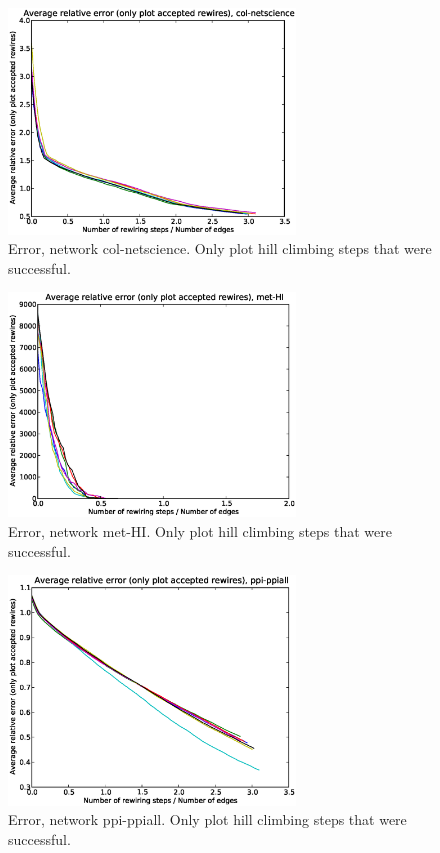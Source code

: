 \begin{figure}[p]
\centering
\includegraphics[width=3in]{Figures/acceptedOnly-col-netscience.eps}
\caption{Error, network col-netscience.  Only plot hill climbing steps that were successful.}
\label{fig:errors-col-netscience}
\end{figure}

\begin{figure}[p]
\centering
\includegraphics[width=3in]{Figures/acceptedOnly-met-HI.eps}
\caption{Error, network met-HI.  Only plot hill climbing steps that were successful.}
\label{fig:errors-met-HI}
\end{figure}

\begin{figure}[p]
\centering
\includegraphics[width=3in]{Figures/acceptedOnly-ppi-ppiall.eps}
\caption{Error, network ppi-ppiall.  Only plot hill climbing steps that were successful.}
\label{fig:errors-ppi-ppiall}
\end{figure}

